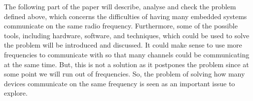 \bigskip \noindent
The following part of the paper will describe, analyse and check the problem defined above, which concerns the difficulties of having many embedded systems communicate on the same radio frequency.
Furthermore, some of the possible tools, including hardware, software, and techniques, which could be used to solve the problem will be introduced and discussed.
It could make sense to use more frequencies to communicate with so that many channels could be communicating at the same time.
But, this is not a solution as it postpones the problem since at some point we will run out of frequencies. 
So, the problem of solving how many devices communicate on the same frequency is seen as an important issue to explore.
